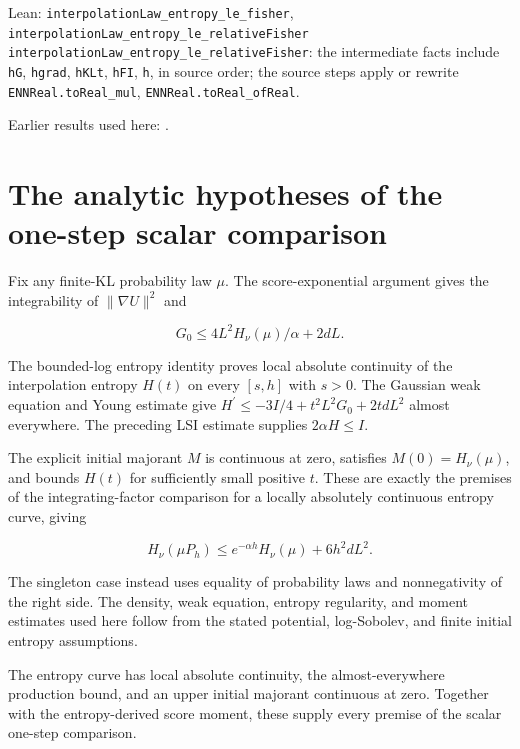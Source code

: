 \documentclass[11pt,a4paper]{article}
\begin{document}
\begin{leanbox}{Lean: \texttt{interpolationLaw\_\allowbreak{}entropy\_\allowbreak{}le\_\allowbreak{}fisher}, \texttt{interpolationLaw\_\allowbreak{}entropy\_\allowbreak{}le\_\allowbreak{}relativeFisher}}
\texttt{interpolation\allowbreak{}Law\_\allowbreak{}entropy\_\allowbreak{}le\_\allowbreak{}relative\allowbreak{}Fisher}: the intermediate facts include \texttt{h\allowbreak{}G}, \texttt{hgrad}, \texttt{h\allowbreak{}KLt}, \texttt{h\allowbreak{}FI}, \texttt{h}, in source order; the source steps apply or rewrite \texttt{ENNReal.\allowbreak{}to\allowbreak{}Real\_\allowbreak{}mul}, \texttt{ENNReal.\allowbreak{}to\allowbreak{}Real\_\allowbreak{}of\allowbreak{}Real}.
\end{leanbox}


Earlier results used here: \cite[Section~3.26.3]{LangevinLean2026ULASC}.

\section{\texorpdfstring{The analytic hypotheses of the one-step scalar comparison}{The analytic hypotheses of the one-step scalar comparison}}


Fix any finite-KL probability law \(\mu\). The score-exponential argument gives the integrability of \(\|\nabla U\|^2\) and

\[G_0\le4L^2H_\nu(\mu)/\alpha+2dL.\]

The bounded-log entropy identity proves local absolute continuity of the interpolation entropy \(H(t)\) on every \([s,h]\) with \(s>0\). The Gaussian weak equation and Young estimate give \(H^{\prime}\le-3I/4+t^2L^2G_0+2tdL^2\) almost everywhere. The preceding LSI estimate supplies \(2\alpha H\le I\).



The explicit initial majorant \(M\) is continuous at zero, satisfies \(M(0)=H_\nu(\mu)\), and bounds \(H(t)\) for sufficiently small positive \(t\). These are exactly the premises of the integrating-factor comparison for a locally absolutely continuous entropy curve, giving

\[H_\nu(\mu P_h)\le e^{-\alpha h}H_\nu(\mu)+6h^2dL^2.\]

The singleton case instead uses equality of probability laws and nonnegativity of the right side. The density, weak equation, entropy regularity, and moment estimates used here follow from the stated potential, log-Sobolev, and finite initial entropy assumptions.



The entropy curve has local absolute continuity, the almost-everywhere production bound, and an upper initial majorant continuous at zero. Together with the entropy-derived score moment, these supply every premise of the scalar one-step comparison.
\end{document}
